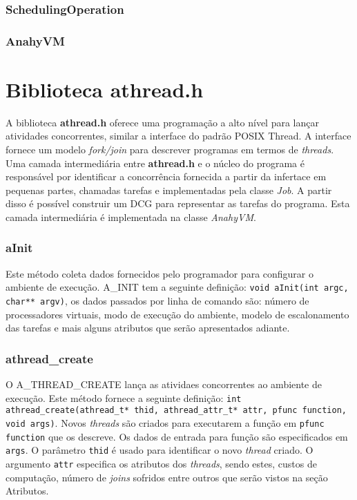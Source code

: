 \documentclass[12pt]{article}
\begin{document}
\subsubsection*{SchedulingOperation} 


\subsubsection*{AnahyVM} 



\section{Biblioteca athread.h} %
\label{sec:athread}

A biblioteca \textbf{athread.h} oferece uma programação a alto nível para lançar atividades concorrentes, similar a interface do 
padrão POSIX Thread. A interface fornece um modelo \emph{fork/join} para descrever programas em termos de \emph{threads}. Uma 
camada intermediária entre \textbf{athread.h} e o núcleo do programa é responsável por identificar a concorrência fornecida 
a partir da infertace em pequenas partes, chamadas tarefas e implementadas pela classe \emph{Job}. A partir disso é possível
construir um DCG para representar as tarefas do programa. Esta camada intermediária é implementada na classe \emph{AnahyVM}.

\subsubsection*{aInit}

Este método coleta dados fornecidos pelo programador para configurar o ambiente de execução. A\_INIT tem a seguinte definição: 
\texttt{void aInit(int argc, char** argv)}, os dados passados por linha de comando são: número de processadores virtuais, modo de 
execução do ambiente, modelo de escalonamento das tarefas e mais alguns atributos que serão apresentados adiante.

\subsubsection*{athread\_create}

O A\_THREAD\_CREATE lança as atividaes concorrentes ao ambiente de execução. Este método fornece a seguinte definição: 
\texttt{int athread\_create(athread\_t* thid, athread\_attr\_t* attr, pfunc function, void\* args)}. Novos \emph{threads} são criados
para executarem a função em \texttt{pfunc function} que os descreve. Os dados de entrada para função são especificados em \texttt{args}.
O parâmetro \texttt{thid} é usado para identificar o novo \emph{thread} criado. O argumento \texttt{attr} especifica os atributos dos 
\emph{threads}, sendo estes, custos de computação, número de \emph{joins} sofridos entre outros que serão vistos na seção Atributos.
\end{document}
